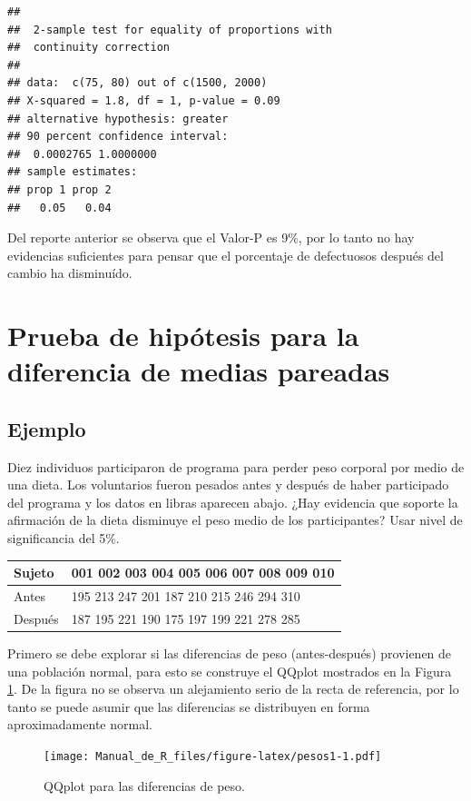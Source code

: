 \documentclass[10pt,]{krantz}
\begin{document}
\begin{verbatim}
## 
##  2-sample test for equality of proportions with
##  continuity correction
## 
## data:  c(75, 80) out of c(1500, 2000)
## X-squared = 1.8, df = 1, p-value = 0.09
## alternative hypothesis: greater
## 90 percent confidence interval:
##  0.0002765 1.0000000
## sample estimates:
## prop 1 prop 2 
##   0.05   0.04
\end{verbatim}

Del reporte anterior se observa que el Valor-P es 9\%, por lo tanto no
hay evidencias suficientes para pensar que el porcentaje de defectuosos
después del cambio ha disminuído.

\section{Prueba de hipótesis para la diferencia de medias
pareadas}\label{prueba-de-hipotesis-para-la-diferencia-de-medias-pareadas}

\subsection*{Ejemplo}\label{ejemplo-70}


Diez individuos participaron de programa para perder peso corporal por
medio de una dieta. Los voluntarios fueron pesados antes y después de
haber participado del programa y los datos en libras aparecen abajo.
¿Hay evidencia que soporte la afirmación de la dieta disminuye el peso
medio de los participantes? Usar nivel de significancia del 5\%.

\begin{longtable}[]{@{}ll@{}}
\toprule
Sujeto & 001 002 003 004 005 006 007 008 009 010\tabularnewline
\midrule
\endhead
Antes & 195 213 247 201 187 210 215 246 294 310\tabularnewline
Después & 187 195 221 190 175 197 199 221 278 285\tabularnewline
\bottomrule
\end{longtable}

Primero se debe explorar si las diferencias de peso (antes-después)
provienen de una población normal, para esto se construye el QQplot
mostrados en la Figura \ref{fig:pesos1}. De la figura no se observa un
alejamiento serio de la recta de referencia, por lo tanto se puede
asumir que las diferencias se distribuyen en forma aproximadamente
normal.

\begin{figure}[htbp]
\centering
\texttt{[image: Manual\_de\_R\_files/figure-latex/pesos1-1.pdf]}
\caption{\label{fig:pesos1}QQplot para las diferencias de peso.}
\end{figure}
\end{document}
